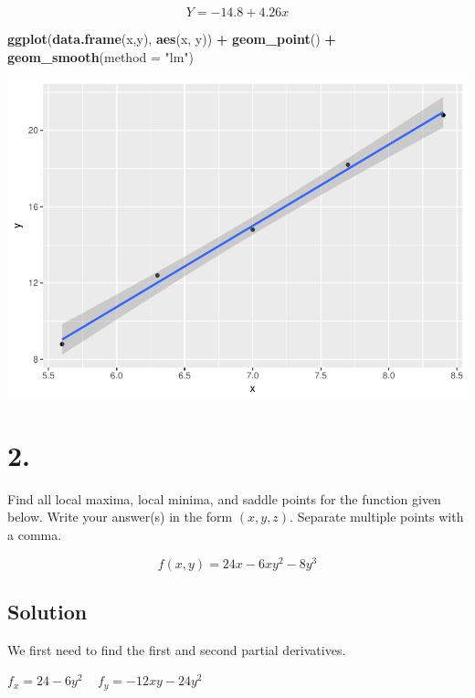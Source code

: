 \documentclass[]{article}
\newenvironment{Shaded}{\begin{snugshade}}{\end{snugshade}}
\newcommand{\DataTypeTok}[1]{\textcolor[rgb]{0.13,0.29,0.53}{#1}}
\newcommand{\KeywordTok}[1]{\textcolor[rgb]{0.13,0.29,0.53}{\textbf{#1}}}
\newcommand{\NormalTok}[1]{#1}
\newcommand{\OperatorTok}[1]{\textcolor[rgb]{0.81,0.36,0.00}{\textbf{#1}}}
\newcommand{\StringTok}[1]{\textcolor[rgb]{0.31,0.60,0.02}{#1}}
\begin{document}
\[
Y = -14.8 + 4.26x
\]

\begin{Shaded}
\begin{Highlighting}[]
\KeywordTok{ggplot}\NormalTok{(}\KeywordTok{data.frame}\NormalTok{(x,y), }\KeywordTok{aes}\NormalTok{(x, y)) }\OperatorTok{+}
\StringTok{  }\KeywordTok{geom_point}\NormalTok{() }\OperatorTok{+}
\StringTok{  }\KeywordTok{geom_smooth}\NormalTok{(}\DataTypeTok{method =} \StringTok{"lm"}\NormalTok{)}
\end{Highlighting}
\end{Shaded}

\includegraphics{DATA_605_Assignment_15_files/figure-latex/unnamed-chunk-3-1.pdf}

\hypertarget{section-1}{%
\section{2.}\label{section-1}}

Find all local maxima, local minima, and saddle points for the function
given below. Write your answer(s) in the form \((x, y, z)\). Separate
multiple points with a comma.

\[
f(x, y) = 24x - 6xy^2 - 8y^3
\]

\hypertarget{solution-1}{%
\subsection{Solution}\label{solution-1}}

We first need to find the first and second partial derivatives.

\(f_x = 24 - 6y^2\) ~ \(f_y = -12xy - 24y^2\)
\end{document}

